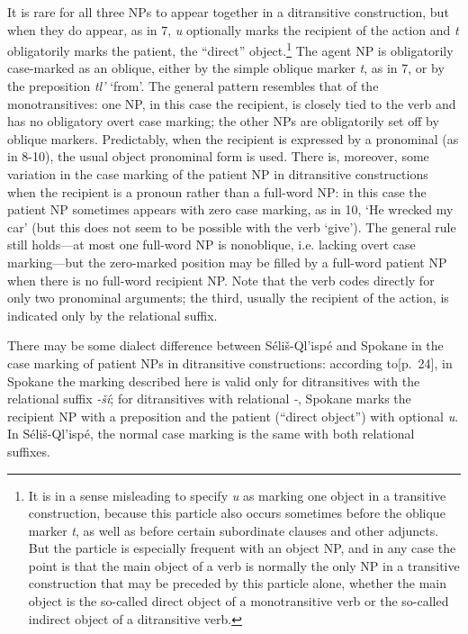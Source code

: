 \documentclass[output=paper,colorlinks,citecolor=brown]{langscibook}
\begin{document}
  It is rare for all three NPs to appear together in a ditransitive
  construction, but when they do appear, as in 7, \emph{{\textltilde}u} optionally marks the recipient of the action and
  \emph{t} obligatorily marks the patient, the ``direct''
  object.\footnote{It is in a sense misleading to specify \emph{{\textltilde}u} as marking one object in a transitive
  construction, because this particle also occurs sometimes before
  the oblique marker \emph{t}, as well as before certain subordinate
  clauses and other adjuncts.  But the particle is especially
  frequent with an object NP, and in any case the point is that the
  main object of a verb is normally the only NP in a transitive
  construction that may be preceded by this particle alone, whether
  the main object is the so-called direct object of a monotransitive
  verb or the so-called indirect object of a ditransitive verb.  }
  The agent NP is obligatorily case-marked as an oblique, either by
  the simple oblique marker \emph{t}, as in 7, or by the preposition
  \emph{tl'} `from'.  The general pattern resembles that of the
  monotransitives: one NP, in this case the recipient, is closely
  tied to the verb and has no obligatory overt case marking; the
  other NPs are obligatorily set off by oblique markers.
  Predictably, when the recipient is expressed by a pronominal (as in
  8-10), the usual object pronominal form is used.  There is,
  moreover, some variation in the case marking of the patient NP in
  ditransitive constructions when the recipient is a pronoun rather
  than a full-word NP: in this case the patient NP sometimes appears
  with zero case marking, as in 10, `He wrecked my car' (but this
  does not seem to be possible with the verb `give').  The general
  rule still holds---at most one full-word NP is nonoblique, i.e.
  lacking overt case marking---but the zero-marked position may be
  filled by a full-word patient NP when there is no full-word
  recipient NP.  Note that the verb codes directly for only two
  pronominal arguments; the third, usually the recipient of the
  action, is indicated only by the relational suffix.

  \medskip

  There may be some dialect difference between S\'eli\v{s}-Ql'isp\'e
  and Spokane in the case marking of patient NPs in ditransitive
  constructions: according to\newline \cite{Carlson:1980}[p.~24], in Spokane the
  marking described here is valid only for ditransitives with the
  relational suffix \emph{-\v{s}\'i}; for ditransitives with
  relational \emph{-{\textltilde}}, Spokane marks the recipient NP
  with a preposition and the patient (``direct object'') with
  optional \emph{{\textltilde}u}.  In S\'eli\v{s}-Ql'isp\'e, the
  normal case marking is the same with both relational suffixes.
\end{document}
